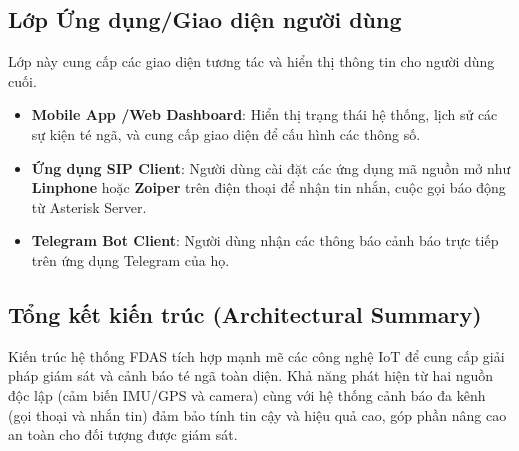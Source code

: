 \subsection{Lớp Ứng dụng\slash Giao diện người dùng}
Lớp này cung cấp các giao diện tương tác và hiển thị thông tin cho người dùng cuối.
\begin{itemize}
    \item \textbf{Mobile App \slash Web Dashboard}: Hiển thị trạng thái hệ thống, lịch sử các sự kiện té ngã, và cung cấp giao diện để cấu hình các thông số.
    \item \textbf{Ứng dụng SIP Client}: Người dùng cài đặt các ứng dụng mã nguồn mở như \textbf{Linphone} hoặc \textbf{Zoiper} trên điện thoại để nhận tin nhắn, cuộc gọi báo động từ Asterisk Server.
    \item \textbf{Telegram Bot Client}: Người dùng nhận các thông báo cảnh báo trực tiếp trên ứng dụng Telegram của họ.
\end{itemize}

\subsection{Tổng kết kiến trúc (Architectural Summary)}
Kiến trúc hệ thống FDAS tích hợp mạnh mẽ các công nghệ IoT để cung cấp giải pháp giám sát và cảnh báo té ngã toàn diện. Khả năng phát hiện từ hai nguồn độc lập (cảm biến IMU\slash GPS và camera) cùng với hệ thống cảnh báo đa kênh (gọi thoại và nhắn tin) đảm bảo tính tin cậy và hiệu quả cao, góp phần nâng cao an toàn cho đối tượng được giám sát.
